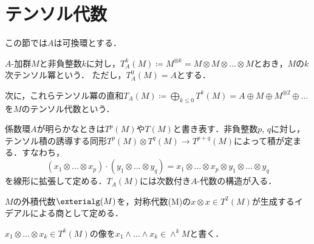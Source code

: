 \section{テンソル代数}
この節では\(A\)は可換環とする．
\begin{defi}
\(A\)-加群\(M\)と非負整数\(k\)に対し，\(T_A^k(M)\coloneqq M^{\otimes k}=M\otimes M\otimes\dots\otimes M\)とおき，\(M\)の\(k\)次テンソル冪という．
ただし，\(T_A^0(M)=A\)とする．

次に，これらテンソル冪の直和\(T_A(M)\coloneqq \bigoplus_{k\leq0}T^k(M)=A\oplus M\oplus M^{\otimes2}\oplus\dots\)を\(M\)のテンソル代数という．
\end{defi}
係数環\(A\)が明らかなときは\(T^p(M)\)や\(T(M)\)と書き表す．非負整数\(p\), \(q\)に対し，テンソル積の誘導する同形\(T^p(M)\otimes T^q(M)\to T^{p+q}(M)\)によって積が定まる．すなわち，
\[(x_1\otimes\dots\otimes x_p)\cdot(y_1\otimes\dots\otimes y_q)=x_1\otimes\dots\otimes x_p\otimes y_1\otimes\dots\otimes y_q\]
を線形に拡張して定める．\(T_A(M)\)には次数付き\(A\)-代数の構造が入る．

\begin{defi}[外積代数]
\(M\)の外積代数\(\exterialg(M)\)を，対称代数\T(M)\)の\(x\otimes x\in T^2(M)\)が生成するイデアルによる商として定める．

\(x_1\otimes\dots\otimes x_k\in T^k(M)\)の像を\(x_1\wedge\dots\wedge x_k\in \wedge^kM\)と書く．
\end{defi}
